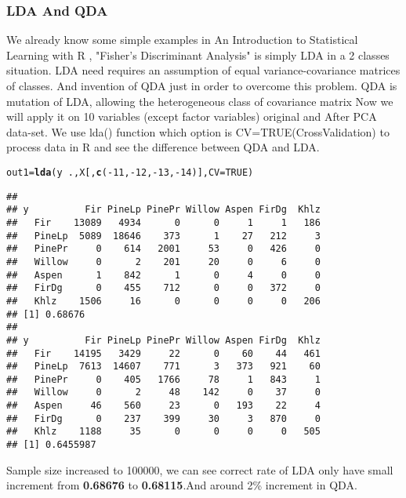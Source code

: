 \documentclass{article}\usepackage[]{graphicx}\usepackage[]{color}
\makeatletter
\newcommand{\hlnum}[1]{\textcolor[rgb]{0.686,0.059,0.569}{#1}}%
\newcommand{\hlopt}[1]{\textcolor[rgb]{0,0,0}{#1}}%
\newcommand{\hlstd}[1]{\textcolor[rgb]{0.345,0.345,0.345}{#1}}%
\newcommand{\hlkwb}[1]{\textcolor[rgb]{0.69,0.353,0.396}{#1}}%
\newcommand{\hlkwc}[1]{\textcolor[rgb]{0.333,0.667,0.333}{#1}}%
\newcommand{\hlkwd}[1]{\textcolor[rgb]{0.737,0.353,0.396}{\textbf{#1}}}%
\newenvironment{kframe}{%
 \def\at@end@of@kframe{}%
 \ifinner\ifhmode%
  \def\at@end@of@kframe{\end{minipage}}%
  \begin{minipage}{\columnwidth}%
 \fi\fi%
 \def\FrameCommand##1{\hskip\@totalleftmargin \hskip-\fboxsep
 \colorbox{shadecolor}{##1}\hskip-\fboxsep
     \hskip-\linewidth \hskip-\@totalleftmargin \hskip\columnwidth}%
 \MakeFramed {\advance\hsize-\width
   \@totalleftmargin\z@ \linewidth\hsize
   \@setminipage}}%
 {\par\unskip\endMakeFramed%
 \at@end@of@kframe}
\newenvironment{knitrout}{}{} %
\makeatother
\begin{document}
	\subsubsection{LDA And QDA}
	\noindent	We already know some simple examples in An Introduction to Statistical Learning with R \cite{5}, "Fisher's Discriminant Analysis" \cite{6} is simply LDA in a 2 classes situation.
	LDA need requires an assumption of equal variance-covariance matrices of classes. And invention of QDA just in order to overcome this problem. QDA is mutation of LDA, allowing the heterogeneous class of covariance matrix
	Now we will apply it on 10 variables (except factor variables) original and After PCA data-set. We use lda() function which option is CV=TRUE(CrossValidation) to process data in R and see the difference between QDA and LDA.\\

\begin{knitrout}
\color{fgcolor}\begin{kframe}
\begin{alltt}
\hlstd{out1} \hlkwb{=} \hlkwd{lda}\hlstd{(y} \hlopt{~} \hlstd{., X[,} \hlkwd{c}\hlstd{(}\hlopt{-}\hlnum{11}\hlstd{,} \hlopt{-}\hlnum{12}\hlstd{,} \hlopt{-}\hlnum{13}\hlstd{,} \hlopt{-}\hlnum{14}\hlstd{)],} \hlkwc{CV} \hlstd{=} \hlnum{TRUE}\hlstd{)}
\end{alltt}
\end{kframe}
\end{knitrout}
\begin{knitrout}
\color{fgcolor}\begin{kframe}
\begin{verbatim}
##         
## y          Fir PineLp PinePr Willow Aspen FirDg  Khlz
##   Fir    13089   4934      0      0     1     1   186
##   PineLp  5089  18646    373      1    27   212     3
##   PinePr     0    614   2001     53     0   426     0
##   Willow     0      2    201     20     0     6     0
##   Aspen      1    842      1      0     4     0     0
##   FirDg      0    455    712      0     0   372     0
##   Khlz    1506     16      0      0     0     0   206
## [1] 0.68676
##         
## y          Fir PineLp PinePr Willow Aspen FirDg  Khlz
##   Fir    14195   3429     22      0    60    44   461
##   PineLp  7613  14607    771      3   373   921    60
##   PinePr     0    405   1766     78     1   843     1
##   Willow     0      2     48    142     0    37     0
##   Aspen     46    560     23      0   193    22     4
##   FirDg      0    237    399     30     3   870     0
##   Khlz    1188     35      0      0     0     0   505
## [1] 0.6455987
\end{verbatim}
\end{kframe}
\end{knitrout}
	\noindent Sample size increased to 100000, we can see correct rate of LDA only have small increment from \textbf{0.68676} to \textbf{0.68115}.And around 2\% increment in QDA.\\
\end{document}
